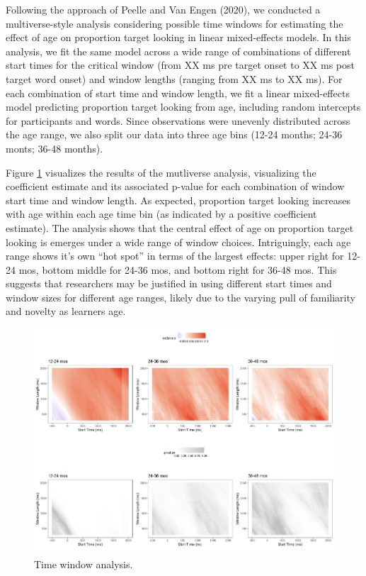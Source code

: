 \documentclass[10pt, letterpaper]{article}
\newenvironment{CodeChunk}{}{}
\begin{document}
Following the approach of Peelle and Van Engen (2020), we conducted a
multiverse-style analysis considering possible time windows for
estimating the effect of age on proportion target looking in linear
mixed-effects models. In this analysis, we fit the same model across a
wide range of combinations of different start times for the critical
window (from XX ms pre target onset to XX ms post target word onset) and
window lengths (ranging from XX ms to XX ms). For each combination of
start time and window length, we fit a linear mixed-effects model
predicting proportion target looking from age, including random
intercepts for participants and words. Since observations were unevenly
distributed across the age range, we also split our data into three age
bins (12-24 months; 24-36 monts; 36-48 months).

Figure \ref{fig:time_window} visualizes the results of the mutliverse
analysis, visualizing the coefficient estimate and its associated
p-value for each combination of window start time and window length. As
expected, proportion target looking increases with age within each age
time bin (as indicated by a positive coefficient estimate). The analysis
shows that the central effect of age on proportion target looking is
emerges under a wide range of window choices. Intriguingly, each age
range shows it's own ``hot spot'' in terms of the largest effects: upper
right for 12-24 mos, bottom middle for 24-36 mos, and bottom right for
36-48 mos. This suggests that researchers may be justified in using
different start times and window sizes for different age ranges, likely
due to the varying pull of familiarity and novelty as learners age.

\begin{CodeChunk}
\begin{figure}[h]

{\centering \includegraphics{figs/time_window-1} 

}

\caption[Time window analysis]{Time window analysis.}\label{fig:time_window}
\end{figure}
\end{CodeChunk}
\end{document}
